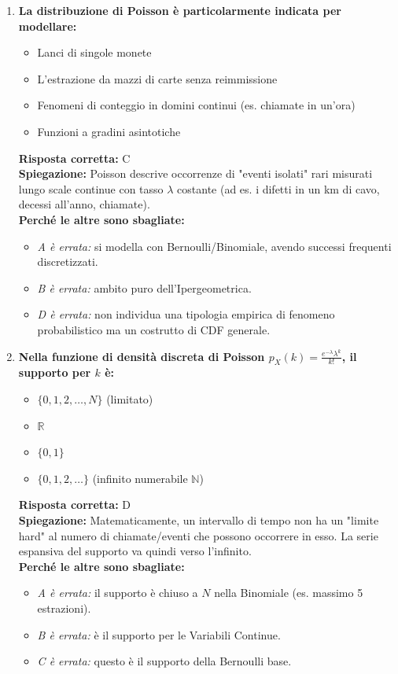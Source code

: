\documentclass[12pt, a4paper]{article}
\begin{document}
\begin{enumerate}[label=\textbf{\arabic*.}]
    \item \textbf{La distribuzione di Poisson è particolarmente indicata per modellare:}
    \begin{itemize}
        \item[A)] Lanci di singole monete
        \item[B)] L'estrazione da mazzi di carte senza reimmissione
        \item[C)] Fenomeni di conteggio in domini continui (es. chiamate in un'ora)
        \item[D)] Funzioni a gradini asintotiche
    \end{itemize}
    \textbf{Risposta corretta:} C \\
    \textbf{Spiegazione:} Poisson descrive occorrenze di "eventi isolati" rari misurati lungo scale continue con tasso $\lambda$ costante (ad es. i difetti in un km di cavo, decessi all'anno, chiamate). \\
    \textbf{Perché le altre sono sbagliate:}
    \begin{itemize}
        \item \textit{A è errata:} si modella con Bernoulli/Binomiale, avendo successi frequenti discretizzati.
        \item \textit{B è errata:} ambito puro dell'Ipergeometrica.
        \item \textit{D è errata:} non individua una tipologia empirica di fenomeno probabilistico ma un costrutto di CDF generale.
    \end{itemize}

    \item \textbf{Nella funzione di densità discreta di Poisson $p_X(k) = \frac{e^{-\lambda} \lambda^k}{k!}$, il supporto per $k$ è:}
    \begin{itemize}
        \item[A)] $\{0, 1, 2, \dots, N\}$ (limitato)
        \item[B)] $\mathbb{R}$
        \item[C)] $\{0, 1\}$
        \item[D)] $\{0, 1, 2, \dots \}$ (infinito numerabile $\mathbb{N}$)
    \end{itemize}
    \textbf{Risposta corretta:} D \\
    \textbf{Spiegazione:} Matematicamente, un intervallo di tempo non ha un "limite hard" al numero di chiamate/eventi che possono occorrere in esso. La serie espansiva del supporto va quindi verso l'infinito. \\
    \textbf{Perché le altre sono sbagliate:}
    \begin{itemize}
        \item \textit{A è errata:} il supporto è chiuso a $N$ nella Binomiale (es. massimo 5 estrazioni).
        \item \textit{B è errata:} è il supporto per le Variabili Continue.
        \item \textit{C è errata:} questo è il supporto della Bernoulli base.
    \end{itemize}


\end{enumerate}
\end{document}
